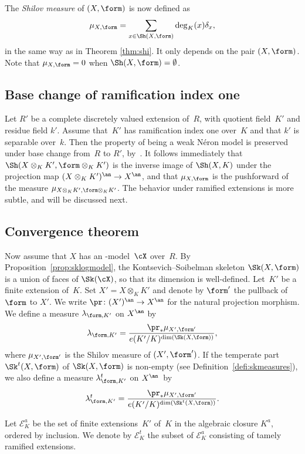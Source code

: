 The \emph{Shilov measure} of $(X,\form)$ is now defined as
\begin{equation*}
\mu_{X,\form}=\sum_{x\in \Sh(X,\form)}\deg_K(x) \delta_x,
\end{equation*}
in the same way as in Theorem \ref{thm:shi}.
It only depends on the pair $(X,\form)$.
Note that $\mu_{X,\form}=0$ when $\Sh(X,\form)=\emptyset$.

\subsection{Base change of ramification index one}
Let $R'$ be a complete discretely valued extension of~$R$, with quotient field~$K'$ and residue field $k'$. Assume that~$K'$ has ramification index one over~$K$ and that $k'$ is separable over~$k$. Then the property of being a weak Néron model is preserved under base change from~$R$ to $R'$, by~\cite[3.6/7]{BLR}.
It follows immediately that $\Sh(X\otimes_K K',\form\otimes_K K')$ is the inverse image of $\Sh(X,K)$ under the projection map
$(X\otimes_K K')^{\an}\to X^{\an}$, and that $\mu_{X,\form}$ is the pushforward of the measure $\mu_{X\otimes_K K',\form\otimes_K K'}$.
The behavior under ramified extensions is more subtle, and will be discussed next.

\subsection{Convergence theorem}
Now assume that $X$ has an \snc-model~$\cX$ over~$R$.
By Proposition~\ref{prop:sklogmodel}, the Kontsevich--Soibelman skeleton $\Sk(X,\form)$ is a union of faces of $\Sk(\cX)$, so that its dimension is well-defined.
Let~$K'$ be a finite extension of~$K$. Set $X'=X\otimes_K K'$ and denote by $\form'$ the pullback of~$\form$ to $X'$. We write $\pr\colon (X')^{\an}\to X^{\an}$ for the natural projection morphism. We define a measure $\lambda_{\form,K'}$ on $X^{\an}$ by
\[
\lambda_{\form,K'}=\frac{\pr_\ast\mu_{X',\form'}}{e(K'/K)^{\dim(\Sk(X,\form))}},
\]
where $\mu_{X',\form'}$ is the Shilov measure of $(X',\form')$.
If the temperate part $\Sk^t(X,\form)$ of $\Sk(X,\form)$ is non-empty (see Definition~\ref{defi:skmeasures}), we also define a measure $\lambda^t_{\form,K'}$ on $X^{\an}$~by
\[
\lambda^t_{\form,K'}=\frac{\pr_\ast\mu_{X',\form'}}{e(K'/K)^{\dim(\Sk^t(X,\form))}}.
\]

Let $\mathcal{E}^a_K$ be the set of finite extensions~$K'$ of~$K$ in the algebraic closure $K^a$, ordered by inclusion. We denote by
$\mathcal{E}^t_K$ the subset of $\mathcal{E}^a_K$ consisting of tamely ramified extensions.

